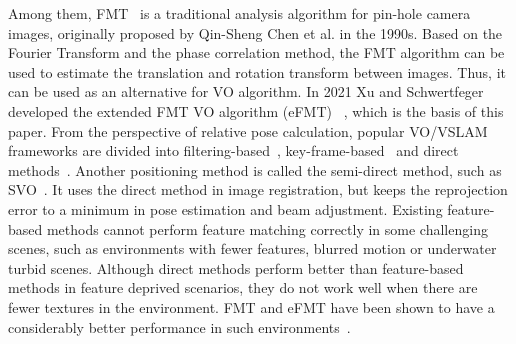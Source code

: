 \documentclass[letterpaper, 10 pt, conference]{ieeeconf}  %
\begin{document}
Among them, FMT~\cite{chen1994symmetric} is a traditional analysis algorithm for pin-hole camera images, originally proposed by Qin-Sheng Chen et al. in the 1990s. Based on the Fourier Transform and the phase correlation method, the FMT algorithm can be used to estimate the translation and rotation transform between images. Thus, it can be used as an alternative for VO algorithm. 
In 2021 Xu and Schwertfeger developed the extended FMT VO algorithm (eFMT) ~\cite{xu2021rethinking}, which is the basis of this paper. 
From the perspective of relative pose calculation, popular VO/VSLAM frameworks are divided into filtering-based~\cite{davison2007monoslam}, key-frame-based~\cite{ORBSLAM3_2020} and direct methods~\cite{engel2014lsd}. Another positioning method is called the semi-direct method, such as SVO~\cite{forster2016svo}. It uses the direct method in image registration, but keeps the reprojection error to a minimum in pose estimation and beam adjustment. Existing feature-based methods cannot perform feature matching correctly in some challenging scenes, such as environments with fewer features, blurred motion or underwater turbid scenes. Although direct methods perform better than feature-based methods in feature deprived scenarios, they do not work well when there are fewer textures in the environment. FMT and eFMT have been shown to have a considerably better performance in such environments~\cite{xu2019improved}. 


\end{document}
